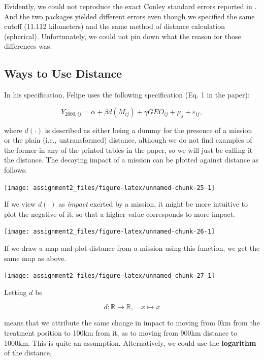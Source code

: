 \documentclass[
  a4paper,
]{article}
\begin{document}
Evidently, we could not reproduce the exact Conley standard errors
reported in \textcite{valencia2019}. And the two packages yielded
different errors even though we specified the same cutoff (11.112
kilometers) and the same method of distance calculation (spherical).
Unfortunately, we could not pin down what the reason for those
differences was.

\subsection{Ways to Use Distance}\label{ways-to-use-distance}

In his specification, Felipe \textcite{valencia2019} uses the following
specification (Eq. 1 in the paper):

\[
Y_{2000,ij} = \alpha + \beta d(M_{ij}) + \gamma GEO_{ij}+\mu_j + \varepsilon_{ij},
\]

where \(d(\cdot)\) is described as either being a dummy for the presence
of a mission or the plain (i.e., untransformed) distance, although we do
not find examples of the former in any of the printed tables in the
paper, so we will just be calling it the distance. The decaying impact
of a mission can be plotted against distance as follows:

\begin{center}\texttt{[image: assignment2\_files/figure-latex/unnamed-chunk-25-1]} \end{center}

If we view \(d(\cdot)\) as \emph{impact} exerted by a mission, it might
be more intuitive to plot the negative of it, so that a higher value
corresponds to more impact.

\begin{center}\texttt{[image: assignment2\_files/figure-latex/unnamed-chunk-26-1]} \end{center}

If we draw a map and plot distance from a mission using this function,
we get the same map as above.

\begin{center}\texttt{[image: assignment2\_files/figure-latex/unnamed-chunk-27-1]} \end{center}

Letting \(d\) be

\[
d: \mathbb{R} \to \mathbb{R}, \quad x \mapsto x
\]

means that we attribute the same change in impact to moving from 0km
from the treatment position to 100km from it, as to moving from 900km
distance to 1000km. This is quite an assumption. Alternatively, we could
use the \textbf{logarithm} of the distance,
\end{document}

